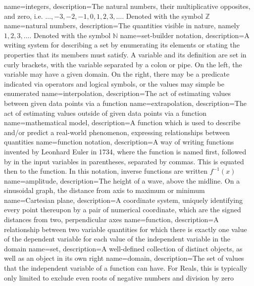 {
	name={integers},
	description={The natural numbers, their multiplicative opposites, and zero, i.e. $\dots, -3, -2, -1, 0, 1, 2, 3, \dots$.  Denoted with the symbol $\mathbb{Z}$}
}
{
	name={natural numbers},
	description={The quantities visible in nature, namely $1, 2, 3, \dots$.  Denoted with the symbol $\mathbb{N}$}
}
{
	name={set-builder notation},
	description={A writing system for describing a set by enumerating its elements or stating the properties that its members must satisfy.  A variable and its definition are set in curly brackets, with the variable separated by a colon or pipe.  On the left, the variable may have a given domain.  On the right, there may be a predicate indicated via operators and logical symbols, or the values may simple be enumerated}
}
{
	name={interpolation},
	description={The act of estimating values between given data points via a function}
}
{
	name={extrapolation},
	description={The act of estimating values outside of given data points via a function}
}
{
	name={mathematical model},
	description={A function which is used to describe and/or predict a real-world phenomenon, expressing relationships between quantities}
}
{
	name={function notation},
	description={A way of writing functions invented by Leonhard Euler in 1734, where the function is named first, followed by in the input variables in parentheses, separated by commas.  This is equated then to the function.  In this notation, inverse functions are written $f^{-1}(x)$}
}
{
	name={amplitude},
	description={The height of a wave, above the midline.  On a sinusoidal graph, the distance from axis to maximum or minimum}
}
{
	name={Cartesian plane},
	description={A coordinate system, uniquely identifying every point thereupon by a pair of numerical coordinate, which are the signed distances from two, perpendicular axes}
}
{
  name=function,
  description={A relationship between two variable quantities for which there is exactly one value of
	the dependent variable for each value of the independent variable in the domain}
}
{
  name=set,
  description={A well-defined collection of distinct objects, as well as an object in its own right}
}
{
  name=domain,
  description={The set of values that the independent variable of a function can have.  For Reals,
  this is typically only limited to exclude even roots of negative numbers and division by zero}
}
